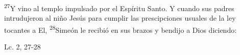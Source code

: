 \documentclass[../../rosario.tex]{subfiles}
\begin{document}
    \textsuperscript{27}Y vino al templo impulsado por el Espíritu Santo. Y cuando sus padres intrudujeron al niño Jesús para cumplir las prescipciones usuales
    de la ley tocantes a El, \textsuperscript{28}Simeón le recibió en sus brazos y bendijo a Dios diciendo:
    \begin{flushright}
    Lc. 2, 27-28         
    \end{flushright}
\end{document}
